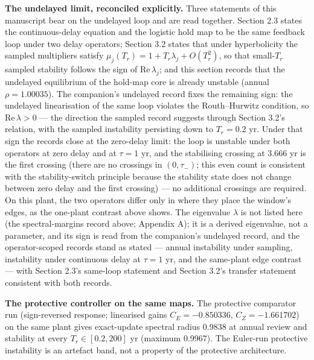 \documentclass[11pt]{article}
\begin{document}
\textbf{The undelayed limit, reconciled explicitly.} Three statements of
this manuscript bear on the undelayed loop and are read together.
Section 2.3 states the continuous-delay
equation and the logistic hold map to be the same feedback loop under
two delay operators; Section 3.2 states that under hyperbolicity the
sampled multipliers satisfy
\(\mu_j(T_r) = 1 + T_r\lambda_j + O(T_r^2)\), so that small-\(T_r\)
sampled stability follows the sign of \(\mathrm{Re}\,\lambda_j\); and this section records that the undelayed equilibrium
of the hold-map core is already unstable (annual \(\rho = 1.00035\)).
The companion's undelayed record fixes the remaining sign: the undelayed
linearisation of the same loop violates the Routh--Hurwitz condition, so
\(\mathrm{Re}\,\lambda > 0\) --- the direction the sampled record suggests through
Section 3.2's relation, with the sampled instability persisting down to
\(T_r = 0.2\) yr. Under that sign the records close at the zero-delay
limit: the loop is unstable under both operators at zero delay and at
\(\tau = 1\) yr, and the stabilising crossing at 3.666 yr is the first
crossing (there are no crossings in \((0,\tau_-)\); this even count is consistent with the stability-switch principle because the stability state does not change between zero delay and the first crossing) --- no
additional crossings are required. On this plant, the two operators differ only in
where they place the window's edges, as the one-plant contrast above
shows. The eigenvalue \(\lambda\) is not listed here
(the spectral-margins record above; Appendix A); it is a derived eigenvalue, not a parameter, and its sign is read from
the companion's undelayed record, and the operator-scoped records stand
as stated --- annual instability under sampling, instability under
continuous delay at \(\tau = 1\) yr, and the same-plant edge contrast
--- with Section 2.3's same-loop statement and Section 3.2's transfer
statement consistent with both records.

\textbf{The protective controller on the same maps.} The protective
comparator run (sign-reversed response; linearised gains \(C_E = -0.850336\), \(C_Z = -1.661702\)) on the same plant
gives exact-update spectral radius 0.9838 at annual review and stability
at every \(T_r \in [0.2, 200]\) yr (maximum 0.9967). The Euler-run
protective instability is an artefact band, not a property of the
protective architecture.
\end{document}
